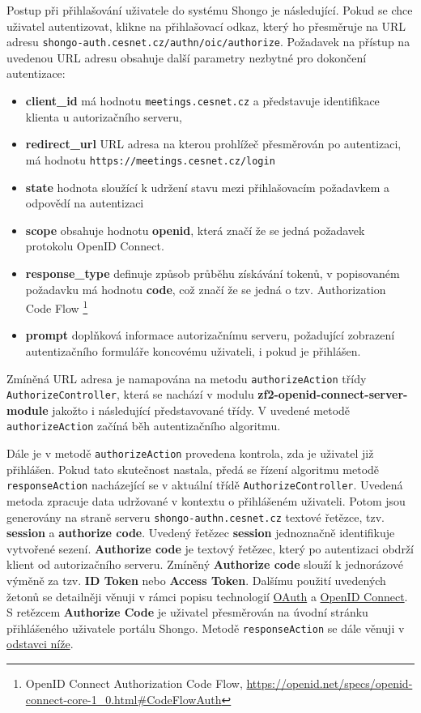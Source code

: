 \documentclass[
  printed, %
  twoside, %
  table,   %
  nolof,     %
  nolot,     %
]{fithesis3}
\begin{document}
Postup při přihlašování uživatele do systému Shongo je následující. Pokud se chce uživatel autentizovat, klikne na přihlašovací odkaz, který ho přesměruje na URL adresu \texttt{shongo-auth.cesnet.cz/authn/oic/authorize}. Požadavek na přístup na uvedenou URL adresu obsahuje další parametry nezbytné pro dokončení autentizace:
\begin{itemize}
    \item \textbf{client\_id} má hodnotu \texttt{meetings.cesnet.cz} a představuje identifikace klienta u autorizačního serveru,
    \item \textbf{redirect\_url} URL adresa na kterou prohlížeč přesměrován po autentizaci, má hodnotu \texttt{https://meetings.cesnet.cz/login} 
    \item \textbf{state} hodnota sloužící k udržení stavu mezi přihlašovacím požadavkem a odpovědí na autentizaci 
    \item \textbf{scope} obsahuje hodnotu \textbf{openid}, která značí že se jedná požadavek protokolu OpenID Connect. 
    \item \textbf{response\_type} definuje způsob průběhu získávání tokenů, v popisovaném požadavku má hodnotu \textbf{code}, což značí že se jedná o tzv. Authorization Code Flow \footnote{OpenID Connect Authorization Code Flow, \url{https://openid.net/specs/openid-connect-core-1_0.html\#CodeFlowAuth}}
    \item \textbf{prompt} doplňková informace autorizačnímu serveru, požadující zobrazení autentizačního formuláře koncovému uživateli, i pokud je přihlášen. 
\end{itemize}


Zmíněná URL adresa je namapována na metodu \texttt{authorizeAction} třídy \texttt{AuthorizeController}, která se nachází v modulu \textbf{zf2-openid-connect-server-module} jakožto i následující představované třídy. V uvedené metodě \texttt{authorizeAction} začíná běh autentizačního algoritmu. \par 

Dále je v metodě \texttt{authorizeAction} provedena kontrola, zda je uživatel již přihlášen. Pokud tato skutečnost nastala, předá se řízení algoritmu metodě \texttt{responseAction} nacházející se v aktuální třídě \texttt{AuthorizeController}. Uvedená metoda zpracuje data udržované v kontextu o přihlášeném uživateli. Potom jsou generovány na straně serveru \texttt{shongo-authn.cesnet.cz} textové řetězce, tzv. \textbf{session} a \textbf{authorize code}. Uvedený řetězec \textbf{session} jednoznačně identifikuje vytvořené sezení. \textbf{Authorize code} je textový řetězec, který po autentizaci obdrží klient od autorizačního serveru. Zmíněný \textbf{Authorize code} slouží k jednorázové výměně za tzv. \textbf{ID Token} nebo \textbf{Access Token}. Dalšímu použití uvedených žetonů se detailněji věnuji v rámci popisu technologií \hyperref[sec:oauth]{OAuth} a \hyperref[sec:oidc]{OpenID Connect}. S retězcem \textbf{Authorize Code} je uživatel přesměrován na úvodní stránku přihlášeného uživatele portálu Shongo. Metodě \texttt{responseAction} se dále věnuji v \hyperref[sec:responseAction]{odstavci níže}. \par 
\end{document}
